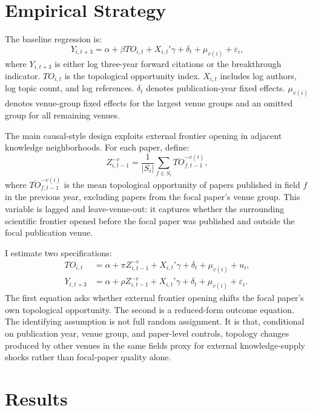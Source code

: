\documentclass[preprint,12pt,authoryear]{elsarticle}
\begin{document}
\section{Empirical Strategy}

The baseline regression is:
\begin{equation}
Y_{i,t+3} =
\alpha + \beta TO_{i,t}
+ X_{i,t}'\gamma
+ \delta_t
+ \mu_{v(i)}
+ \varepsilon_i,
\end{equation}
where $Y_{i,t+3}$ is either log three-year forward citations or the breakthrough indicator. $TO_{i,t}$ is the topological opportunity index. $X_{i,t}$ includes log authors, log topic count, and log references. $\delta_t$ denotes publication-year fixed effects. $\mu_{v(i)}$ denotes venue-group fixed effects for the largest venue groups and an omitted group for all remaining venues.

The main causal-style design exploits external frontier opening in adjacent knowledge neighborhoods. For each paper, define:
\begin{equation}
Z_{i,t-1}^{-v} =
\frac{1}{|S_i|}
\sum_{f\in S_i}
\overline{TO}_{f,t-1}^{-v(i)},
\end{equation}
where $\overline{TO}_{f,t-1}^{-v(i)}$ is the mean topological opportunity of papers published in field $f$ in the previous year, excluding papers from the focal paper's venue group. This variable is lagged and leave-venue-out: it captures whether the surrounding scientific frontier opened before the focal paper was published and outside the focal publication venue.

I estimate two specifications:
\begin{align}
TO_{i,t} &= \alpha + \pi Z_{i,t-1}^{-v} + X_{i,t}'\gamma + \delta_t + \mu_{v(i)} + u_i,\\
Y_{i,t+3} &= \alpha + \rho Z_{i,t-1}^{-v} + X_{i,t}'\gamma + \delta_t + \mu_{v(i)} + \varepsilon_i.
\end{align}
The first equation asks whether external frontier opening shifts the focal paper's own topological opportunity. The second is a reduced-form outcome equation. The identifying assumption is not full random assignment. It is that, conditional on publication year, venue group, and paper-level controls, topology changes produced by other venues in the same fields proxy for external knowledge-supply shocks rather than focal-paper quality alone.

\section{Results}
\end{document}
